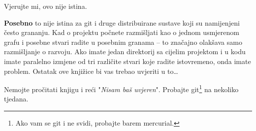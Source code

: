 Vjerujte mi, ovo nije istina.

\textbf{Posebno} to nije istina za git i druge distribuirane sustave koji su namijenjeni često grananju.
Kad o projektu počnete razmišljati kao o jednom usmjerenom grafu i posebne stvari radite u posebnim granama -- to značajno olakšava samo razmišljanje o razvoju.
Ako imate jedan direktorij sa cijelim projektom i u kodu imate paralelno izmjene od tri različite stvari koje radite istovremeno, onda imate problem.
Ostatak ove knjižice bi vas trebao uvjeriti u to\dots

Nemojte pročitati knjigu i reći "\emph{Nisam baš uvjeren}". 
Probajte git\footnote{Ako vam se git i ne svidi, probajte barem mercurial.} na nekoliko tjedana.

